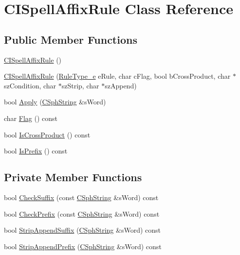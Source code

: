 \hypertarget{classCISpellAffixRule}{\section{C\-I\-Spell\-Affix\-Rule Class Reference}
\label{classCISpellAffixRule}
}
\subsection*{Public Member Functions}
\begin{DoxyCompactItemize}
\item 
\hyperlink{classCISpellAffixRule_a816a249f3f74eb6c7fd8826ae5d6ab50}{C\-I\-Spell\-Affix\-Rule} ()
\item 
\hyperlink{classCISpellAffixRule_aa7d3f11bf37a667bbab579d82886b648}{C\-I\-Spell\-Affix\-Rule} (\hyperlink{spelldump_8cpp_a64a5bdd2a31b6b4ea79d491b81ea0a1c}{Rule\-Type\-\_\-e} e\-Rule, char c\-Flag, bool b\-Cross\-Product, char $\ast$sz\-Condition, char $\ast$sz\-Strip, char $\ast$sz\-Append)
\item 
bool \hyperlink{classCISpellAffixRule_a8d0f4f3c03adf1cf6ce1e47fcfcf0cdf}{Apply} (\hyperlink{structCSphString}{C\-Sph\-String} \&s\-Word)
\item 
char \hyperlink{classCISpellAffixRule_a26166a1ae70b13844a71aa7474c9b880}{Flag} () const 
\item 
bool \hyperlink{classCISpellAffixRule_a9bd79ef6440a7ed12f781489908feebb}{Is\-Cross\-Product} () const 
\item 
bool \hyperlink{classCISpellAffixRule_af26a7bd9fbf8d198d23ab8ccd25df7ab}{Is\-Prefix} () const 
\end{DoxyCompactItemize}
\subsection*{Private Member Functions}
\begin{DoxyCompactItemize}
\item 
bool \hyperlink{classCISpellAffixRule_a5e203257b49c6ee7adff6a600b1ef200}{Check\-Suffix} (const \hyperlink{structCSphString}{C\-Sph\-String} \&s\-Word) const 
\item 
bool \hyperlink{classCISpellAffixRule_a618a6981a8a869fdd63525e862803330}{Check\-Prefix} (const \hyperlink{structCSphString}{C\-Sph\-String} \&s\-Word) const 
\item 
bool \hyperlink{classCISpellAffixRule_a5bd501dcbc5d5f94661c9f7b77d0888f}{Strip\-Append\-Suffix} (\hyperlink{structCSphString}{C\-Sph\-String} \&s\-Word) const 
\item 
bool \hyperlink{classCISpellAffixRule_a3cabbaa9a8df8211b6c649ab19fde5c5}{Strip\-Append\-Prefix} (\hyperlink{structCSphString}{C\-Sph\-String} \&s\-Word) const 
\end{DoxyCompactItemize}
